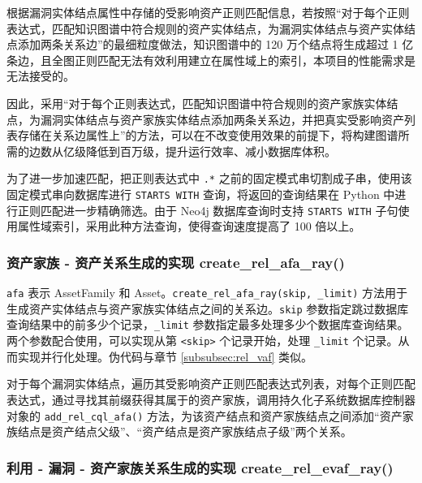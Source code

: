 \documentclass[a4paper,AutoFakeBold,oneside,12pt]{book}
\begin{document}
根据漏洞实体结点属性中存储的受影响资产正则匹配信息，若按照``对于每个正则表达式，匹配知识图谱中符合规则的资产实体结点，为漏洞实体结点与资产实体结点添加两条关系边''的最细粒度做法，知识图谱中的 120 万个结点将生成超过 1 亿条边，且全图正则匹配无法有效利用建立在属性域上的索引，本项目的性能需求是无法接受的。

因此，采用``对于每个正则表达式，匹配知识图谱中符合规则的资产家族实体结点，为漏洞实体结点与资产家族实体结点添加两条关系边，并把真实受影响资产列表存储在关系边属性上''的方法，可以在不改变使用效果的前提下，将构建图谱所需的边数从亿级降低到百万级，提升运行效率、减小数据库体积。

为了进一步加速匹配，把正则表达式中 \lstinline|.*| 之前的固定模式串切割成子串，使用该固定模式串向数据库进行 \lstinline|STARTS WITH| 查询，将返回的查询结果在 Python 中进行正则匹配进一步精确筛选。由于 Neo4j 数据库查询时支持 \lstinline|STARTS WITH| 子句使用属性域索引，采用此种方法查询，使得查询速度提高了 100 倍以上。

\subsubsection{资产家族 - 资产关系生成的实现 create{\_}rel{\_}afa{\_}ray()}

\lstinline|afa| 表示 AssetFamily 和 Asset。\lstinline|create_rel_afa_ray(skip, _limit)| 方法用于生成资产实体结点与资产家族实体结点之间的关系边。\lstinline|skip| 参数指定跳过数据库查询结果中的前多少个记录，\lstinline|_limit| 参数指定最多处理多少个数据库查询结果。两个参数配合使用，可以实现从第 \lstinline|<skip>| 个记录开始，处理 \lstinline|_limit| 个记录。从而实现并行化处理。伪代码与章节 \ref{subsubsec:rel_vaf}  类似。

对于每个漏洞实体结点，遍历其受影响资产正则匹配表达式列表，对每个正则匹配表达式，通过寻找其前缀获得其属于的资产家族，调用持久化子系统数据库控制器对象的 \lstinline|add_rel_cql_afa()| 方法，为该资产结点和资产家族结点之间添加``资产家族结点是资产结点父级''、``资产结点是资产家族结点子级''两个关系。

\subsubsection{利用 - 漏洞 - 资产家族关系生成的实现 create{\_}rel{\_}evaf{\_}ray()}
\end{document}
